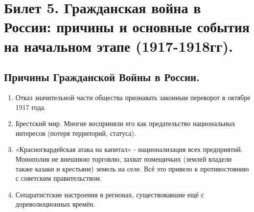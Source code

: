 \section{Билет 5. Гражданская война в России: причины и основные события на начальном этапе (1917-1918гг).}

\subsection{Причины Гражданской Войны в России.}
\begin{enumerate}
	\item Отказ значительной части общества признавать законным переворот в октябре 1917 года.\\
	\item Брестский мир. Многие восприняли его как предательство национальных интересов (потеря территорий, статуса). \\
	\item «Красногвардейская атака на капитал» - национализация всех предприятий. Монополия не внешнюю торговлю, захват помещичьих (землей владели также казаки и крестьяне) земель на селе. Всё это привело к противостоянию с советским правительством. \\
	\item Сепаратистские настроения в регионах, существовавшие ещё с дореволюционных времён.
\end{enumerate}

